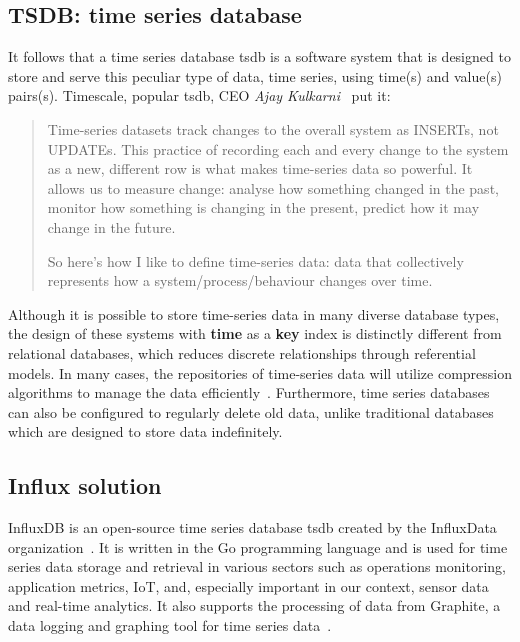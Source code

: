 \subsection{TSDB: time series database}
It follows that a time series database \acs{tsdb} is a software system that is designed to store and serve this peculiar type of data, time series, using time(s) and value(s) pairs(s).
Timescale, popular \ac{tsdb}, CEO \textit{Ajay Kulkarni}~\cite{Misc:asay_why_time_series} put it:
\begin{quote}
    Time-series datasets track changes to the overall system 
    as INSERTs, not UPDATEs.
    This practice of recording each and every change to the system as a new, different row is what makes time-series data so powerful.
    It allows us to measure change: analyse how something changed in the past, monitor how something is changing in the present, predict how it may change in the future.
    
    So here's how I like to define time-series data: data that collectively represents how a system/process/behaviour changes over time.
\end{quote}
Although it is possible to store time-series data in many diverse database types, the design of these systems with \textbf{time} as a \textbf{key} index is distinctly different from relational databases, which reduces discrete relationships through referential models.
In many cases, the repositories of time-series data will utilize compression algorithms to manage the data efficiently~\cite{Book:devops_cookbook}. Furthermore, time series databases can also be configured to regularly delete old data, unlike traditional databases which are designed to store data indefinitely.

\subsection{Influx solution}
InfluxDB is an open-source time series database \acs{tsdb} created by the InfluxData organization~\cite{Misc:influxdata_website}. 
It is written in the Go programming language and is used for time series data storage and retrieval in various sectors such as operations monitoring, application metrics, \acl{IoT}, and, especially important in our context, sensor data and real-time analytics.
It also supports the processing of data from Graphite, a data logging and graphing tool for time series data~\cite{Misc:thegraphiteproject_2021_graphite}.

